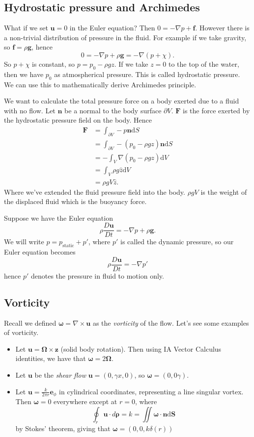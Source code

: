 \documentclass{article}
\begin{document}
\subsection{Hydrostatic pressure and Archimedes}
What if we set $ \mathbf u = 0 $ in the Euler equation? Then $ 0 = -\nabla p + \mathbf f $. However there is a non-trivial distribution of pressure in the fluid. For example if we take gravity, so $\mathbf f = \rho \mathbf g $, hence 
\[
  0 = -\nabla p + \rho \mathbf g = -\nabla(p+\chi).
\]
So $ p+\chi $ is constant, so $ p = p_0 - \rho g z $. If we take $ z=0 $ to the top of the water, then we have $ p_0 $ as atmospherical pressure. This is called hydrostatic pressure. We can use this to mathematically derive Archimedes principle.\par
We want to calculate the total pressure force on a body exerted due to a fluid with no flow. Let $ \mathbf n $ be a normal to the body surface $ \partial V $. $ \mathbf F $ is the force exerted by the hydrostatic pressure field on the body. Hence
\begin{align*}
	\mathbf F &= \int_{\partial V} -p\mathbf n \mathrm dS\\
		  &= \int_{\partial V} -(p_0 - \rho g z)\mathbf n \mathrm dS\\
		  &= -\int_V \nabla (p_0 - \rho g z) \mathrm dV\\
		  &= \int_V \rho g \hat z \mathrm dV\\
		  &= \rho g V\hat z.
\end{align*}
Where we've extended the fluid pressure field into the body. $ \rho g V $ is the weight of the displaced fluid which is the buoyancy force.
\begin{remark}
  Suppose we have the Euler equation
  \[
	  \rho \frac{D\mathbf u }{Dt} = - \nabla p + \rho \mathbf g.
  \]
  We will write $ p = p_{\text{static}}+p' $, where $ p' $ is called the dynamic pressure, so our Euler equation becomes
  \[
	  \rho \frac{D\mathbf u}{Dt} = -\nabla p'
  \]
  hence $ p' $ denotes the pressure in fluid to motion only. 
\end{remark}
\subsection{Vorticity}
Recall we defined $ \boldsymbol \omega = \nabla\times \mathbf u $ as the \textit{vorticity} of the flow. Let's see some examples of vorticity.
\begin{itemize}
	\item Let $ \mathbf u = \boldsymbol \Omega \times \mathbf z $ (solid body rotation). Then using IA Vector Calculus identities, we have that $ \boldsymbol \omega = 2\boldsymbol\Omega $.
	\item Let $ \mathbf u$ be the \textit{shear flow} $ \mathbf u = (0,\gamma x,0) $, so $ \boldsymbol \omega = (0,0\gamma) $.
	\item Let $ \mathbf u = \frac{k}{2\pi r} \mathbf e_\phi $ in cylindrical coordinates, representing a line singular vortex. Then $ \boldsymbol \omega = 0 $ everywhere except at $ r = 0 $, where
		\[
		  \oint_r \mathbf u \cdot d\boldsymbol \rho = k =\iint \boldsymbol\omega \cdot\mathbf n \mathrm d\mathbf S
		\]
		by Stokes' theorem, giving that $ \boldsymbol\omega = (0,0,k\delta(r)) $
\end{itemize}
\end{document}
